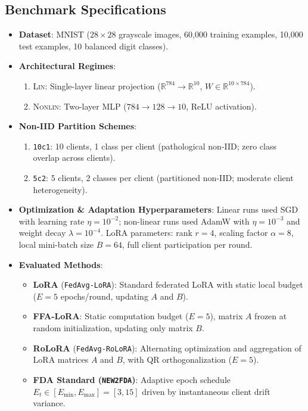 \documentclass[10pt,a4paper]{article}
\begin{document}
\subsection{Benchmark Specifications}
\begin{itemize}
    \item \textbf{Dataset}: MNIST ($28 \times 28$ grayscale images, 60,000 training examples, 10,000 test examples, 10 balanced digit classes).
    \item \textbf{Architectural Regimes}:
    \begin{enumerate}
        \item \textsc{Lin}: Single-layer linear projection ($\mathbb{R}^{784} \to \mathbb{R}^{10}$, $W \in \mathbb{R}^{10 \times 784}$).
        \item \textsc{Nonlin}: Two-layer MLP ($784 \to 128 \to 10$, ReLU activation).
    \end{enumerate}
    \item \textbf{Non-IID Partition Schemes}:
    \begin{enumerate}
        \item \texttt{10c1}: 10 clients, 1 class per client (pathological non-IID; zero class overlap across clients).
        \item \texttt{5c2}: 5 clients, 2 classes per client (partitioned non-IID; moderate client heterogeneity).
    \end{enumerate}
    \item \textbf{Optimization \& Adaptation Hyperparameters}: Linear runs used SGD with learning rate $\eta=10^{-2}$; non-linear runs used AdamW with $\eta=10^{-3}$ and weight decay $\lambda=10^{-4}$. LoRA parameters: rank $r=4$, scaling factor $\alpha=8$, local mini-batch size $B=64$, full client participation per round.
    \item \textbf{Evaluated Methods}:
    \begin{itemize}
        \item \textbf{LoRA} (\texttt{FedAvg-LoRA}): Standard federated LoRA with static local budget ($E=5$ epochs/round, updating $A$ and $B$).
        \item \textbf{FFA-LoRA}: Static computation budget ($E=5$), matrix $A$ frozen at random initialization, updating only matrix $B$.
        \item \textbf{RoLoRA} (\texttt{FedAvg-RoLoRA}): Alternating optimization and aggregation of LoRA matrices $A$ and $B$, with QR orthogonalization ($E=5$).
        \item \textbf{FDA Standard (\texttt{NEW2FDA})}: Adaptive epoch schedule $E_t \in [E_{\min}, E_{\max}] = [3, 15]$ driven by instantaneous client drift variance.

\end{itemize}
\end{itemize}
\end{document}

